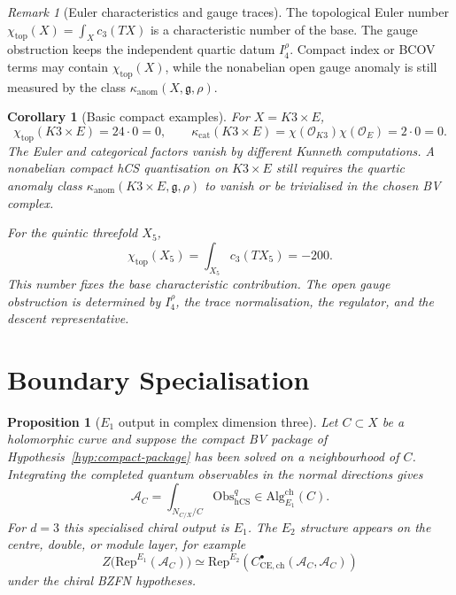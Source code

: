 \documentclass[11pt]{amsart}
\providecommand{\gfrak}{\mathfrak{g}}
\providecommand{\hCS}{\mathrm{hCS}}
\providecommand{\Obs}{\mathrm{Obs}}
\providecommand{\CE}{\mathrm{CE}}
\providecommand{\Rep}{\mathrm{Rep}}
\providecommand{\cO}{\mathcal{O}}
\providecommand{\Eone}{E_1}
\providecommand{\Etwo}{E_2}
\providecommand{\kanom}{\kappa_{\mathrm{anom}}}
\providecommand{\kcat}{\kappa_{\mathrm{cat}}}
\theoremstyle{plain}
\newtheorem{proposition}[theorem]{Proposition}
\newtheorem{corollary}[theorem]{Corollary}
\theoremstyle{definition}
\theoremstyle{remark}
\newtheorem{remark}[theorem]{Remark}
\begin{document}
\begin{remark}[Euler characteristics and gauge traces]
\label{rem:euler-gauge}
The topological Euler number
$\chi_{\mathrm{top}}(X)=\int_Xc_3(TX)$ is a characteristic number of the
base. The gauge obstruction keeps the independent quartic datum
$I_4^\rho$. Compact index or BCOV terms may contain
$\chi_{\mathrm{top}}(X)$, while the nonabelian open gauge anomaly is
still measured by the class
$\kanom(X,\gfrak,\rho)$.
\end{remark}

\begin{corollary}[Basic compact examples]
\label{cor:compact-examples}
For $X=K3\times E$,
\[
  \chi_{\mathrm{top}}(K3\times E)=24\cdot0=0,
  \qquad
  \kcat(K3\times E)=\chi(\cO_{K3})\chi(\cO_E)=2\cdot0=0.
\]
The Euler and categorical factors vanish by different Kunneth
computations. A nonabelian compact hCS quantisation on $K3\times E$
still requires the quartic anomaly class
$\kanom(K3\times E,\gfrak,\rho)$ to vanish or be trivialised in the
chosen BV complex.

For the quintic threefold $X_5$,
\[
  \chi_{\mathrm{top}}(X_5)=\int_{X_5}c_3(TX_5)=-200.
\]
This number fixes the base characteristic contribution. The open gauge
obstruction is determined by $I_4^\rho$, the trace normalisation, the
regulator, and the descent representative.
\end{corollary}

\section{Boundary Specialisation}
\label{sec:boundary-specialisation}

\begin{proposition}[$\Eone$ output in complex dimension three]
\label{prop:e1-output}
Let $C\subset X$ be a holomorphic curve and suppose the compact BV
package of Hypothesis~\ref{hyp:compact-package} has been solved on a
neighbourhood of $C$. Integrating the completed quantum observables in
the normal directions gives
\[
  \mathcal A_C=
  \int_{N_{C/X}/C}\Obs^q_{\hCS}
  \in \mathrm{Alg}^{\mathrm{ch}}_{\Eone}(C).
\]
For $d=3$ this specialised chiral output is $\Eone$. The $\Etwo$
structure appears on the centre, double, or module layer, for example
\[
  Z\bigl(\Rep^{\Eone}(\mathcal A_C)\bigr)
  \simeq
  \Rep^{\Etwo}\!\left(
    C^\bullet_{\CE,\mathrm{ch}}(\mathcal A_C,\mathcal A_C)
  \right)
\]
under the chiral BZFN hypotheses.
\end{proposition}
\end{document}
